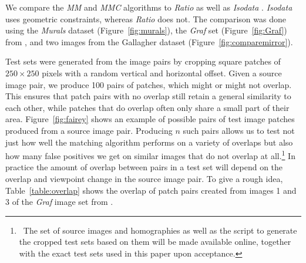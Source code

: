 \documentclass{article}
\begin{document}


%
%
We compare the \emph{MM} and \emph{MMC} algorithms to 
\emph{Ratio} \cite{lowe2004sift} as well 
as \emph{Isodata} \cite{das2008event}. 
\emph{Isodata} uses geometric constraints, whereas \emph{Ratio} does not.
The 
comparison was done using the \emph{Murals} dataset (Figure~\ref{fig:murals}), the 
\emph{Graf} set (Figure~\ref{fig:Graf}) from \cite{mikolajczyk2005performance}, and two 
images %
from the Gallagher dataset \cite{gallagher2008} (Figure~\ref{fig:comparemirror}).

Test sets were generated from the image pairs by cropping square patches of
$250\!\times\!250$ pixels with a random vertical and horizontal offset.  
Given a source image pair, we produce 100 pairs of patches, which might or might not overlap.  
This ensures that patch pairs with no overlap still retain a general similarity to each 
other, while patches that do overlap often only share a small 
part of their area. Figure~\ref{fig:fairey} shows an example of 
possible pairs of test image patches produced from a source image pair.  
Producing $n$ such pairs allows us to test not just how well the 
matching algorithm performs on a variety of overlaps but also how many 
false positives we get on similar images that do not overlap at 
all.\footnote{~The set of source images and homographies as well as the 
script to generate the cropped test sets based on them will be made 
available online, together with the exact test sets used in this paper 
upon acceptance.}
In practice the amount of overlap between pairs in a test set will 
depend on the overlap and viewpoint change in the source image pair.  To 
give a rough idea, Table~\ref{table:overlap} 
shows the overlap of patch pairs created from images 1 and 3 of the 
\emph{Graf} image set from \cite{mikolajczyk2005performance}.
\end{document}
